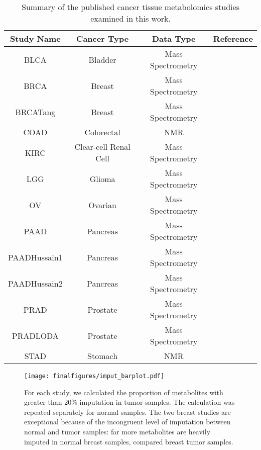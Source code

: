\documentclass[10pt]{article}
\newcommand{\beginsupplement}{%
        \setcounter{table}{0}
        \renewcommand{\thetable}{S\arabic{table}}%
        \setcounter{figure}{0}
        \renewcommand{\thefigure}{S\arabic{figure}}%
     }
\begin{document}



\beginsupplement
\newpage

\begin{table}
\centering
\begin{tabular}{ c c c c }
  \textbf{Study Name} & \textbf{Cancer Type} & Data Type & \textbf{Reference}  \\
  \hline
  BLCA & Bladder & Mass Spectrometry & \cite{Putluri2011} \\
  BRCA & Breast & Mass Spectrometry & \cite{Terunuma2014} \\
  BRCATang & Breast & Mass Spectrometry & \cite{Tang2014} \\
  COAD & Colorectal & NMR & \cite{Hirayama2009} \\
  KIRC & Clear-cell Renal Cell & Mass Spectrometry & \cite{Hakimi2015} \\
  LGG & Glioma & Mass Spectrometry & \cite{Chinnaiyan2012} \\
  OV & Ovarian & Mass Spectrometry & \cite{Fong2011} \\
  PAAD & Pancreas & Mass Spectrometry & \cite{Kamphorst2015} \\
  PAADHussain1 & Pancreas & Mass Spectrometry & \cite{Zhang2013} \\
  PAADHussain2 & Pancreas & Mass Spectrometry & \cite{Zhang2013} \\
  PRAD & Prostate & Mass Spectrometry & \cite{Sreekumar2009} \\
  PRADLODA & Prostate & Mass Spectrometry & \cite{Priolo2014} \\
  STAD & Stomach & NMR & \cite{Hirayama2009}
\end{tabular}
\caption{Summary of the published cancer tissue metabolomics studies examined in this work.}
\label{table:SITab_Studies}
\end{table}

\begin{figure}[ht!]
  \centering
     \texttt{[image: finalfigures/imput\_barplot.pdf]}
  \caption{For each study, we calculated the proportion of metabolites with greater than 20\% imputation in tumor samples. The calculation was repeated separately for normal samples. The two breast studies are exceptional because of the incongruent level of imputation between normal and tumor samples: far more metabolites are heavily imputed in normal breast samples, compared breast tumor samples. }
     \label{fig:SIFig_Imputation}
\end{figure}
\end{document}
